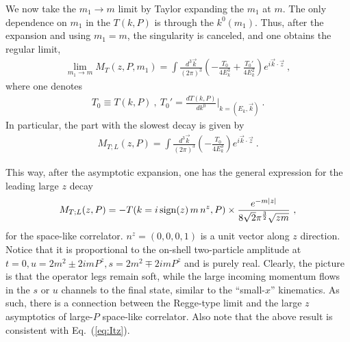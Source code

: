 \documentclass[a4paper,11pt]{article}
\begin{document}
We now take the $m_1\rightarrow m$ limit by Taylor expanding the $m_1$ at $m$. The only dependence on $m_1$ in the $T(k,P)$ is through the $k^0(m_1)$. Thus, after the expansion and using $m_1=m$, the singularity is canceled, and one obtains the regular limit,
\begin{align}
\lim_{m_1\rightarrow m} M_{T}(z,P,m_1)=\int\frac{d^3\vec{k}}{(2\pi)^3}\left(-\frac{T_0}{4E_k^3}+\frac{T_0'}{4E_k^2}\right)e^{i\vec{k}\cdot \vec{z}}\ , 
\end{align}
where one denotes 
\begin{align}
T_0\equiv T(k,P) \ , \ T_0'=\frac{d T(k,P)}{dk^0}\bigg|_{k=(E_k,\vec{k})} \ . 
\end{align}
In particular, the part with the slowest decay is given by
\begin{align}
M_{T;L}(z,P)=\int\frac{d^3\vec{k}}{(2\pi)^3}\left(-\frac{T_0}{4E_k^3}\right)e^{i\vec{k}\cdot \vec{z}} \ .
\end{align}

This way, after the asymptotic expansion, one has the general expression for the leading large $z$ decay
\begin{align}
M_{T;L}(z,P)=-T(k=i \, {\rm sign}(z) \, m \, n^z,P)\times\frac{e^{-m|z|}}{8\sqrt{2}\pi^{\frac{3}{2}} \sqrt{zm}} \ , 
\end{align}
for the space-like correlator. $n^z=(0,0,0,1)$ is a unit vector along $z$ direction. Notice that it is proportional to the on-shell two-particle amplitude at $t=0, u=2m^2\pm 2imP^z, s=2m^2\mp2imP^z$ and is purely real. Clearly, the picture is that the operator legs remain soft, while the large incoming momentum flows in the $s$ or $u$ channels to the final state, similar to the ``small-$x$'' kinematics. As such, there is a connection between the Regge-type limit and the large $z$ asymptotics of large-$P$ space-like correlator. Also note that the above result is consistent with Eq.~(\ref{eq:Itz}).

\end{document}
